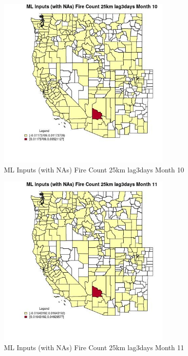 \begin{figure} 
\centering  
\includegraphics[width=0.77\textwidth]{Code_Outputs/Report_ML_input_PM25_Step4_part_e_de_duplicated_aves_compiled_2019-05-21wNAs_CountyFire_Count_25km_lag3daysmedianMonth10.jpg} 
\caption{\label{fig:Report_ML_input_PM25_Step4_part_e_de_duplicated_aves_compiled_2019-05-21wNAsCountyFire_Count_25km_lag3daysmedianMonth10}ML Inputs (with NAs) Fire Count 25km lag3days Month 10} 
\end{figure} 
 

\begin{figure} 
\centering  
\includegraphics[width=0.77\textwidth]{Code_Outputs/Report_ML_input_PM25_Step4_part_e_de_duplicated_aves_compiled_2019-05-21wNAs_CountyFire_Count_25km_lag3daysmedianMonth11.jpg} 
\caption{\label{fig:Report_ML_input_PM25_Step4_part_e_de_duplicated_aves_compiled_2019-05-21wNAsCountyFire_Count_25km_lag3daysmedianMonth11}ML Inputs (with NAs) Fire Count 25km lag3days Month 11} 
\end{figure} 
 

